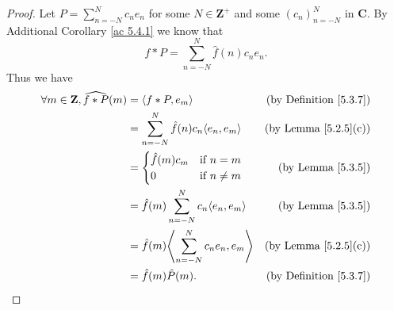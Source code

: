 \begin{proof}
    Let \(P = \sum_{n = -N}^N c_n e_n\) for some \(N \in \mathbf{Z}^+\) and some \((c_n)_{n = -N}^N\) in \(\mathbf{C}\).
    By Additional Corollary \ref{ac 5.4.1} we know that
    \[
        f * P = \sum_{n = -N}^N \hat{f}(n) c_n e_n.
    \]
    Thus we have
    \begin{align*}
        \forall m \in \mathbf{Z}, \widehat{f * P}(m) & = \inner{f * P, e_m}                               & \text{(by Definition \ref{5.3.7})} \\
                                                     & = \sum_{n = -N}^N \hat{f}(n) c_n \inner{e_n, e_m}  & \text{(by Lemma \ref{5.2.5}(c))}   \\
                                                     & = \begin{cases}
                                                             \hat{f}(m) c_m & \text{if } n = m    \\
                                                             0              & \text{if } n \neq m
                                                         \end{cases}            & \text{(by Lemma \ref{5.3.5})}                                \\
                                                     & = \hat{f}(m) \sum_{n = -N}^N c_n \inner*{e_n, e_m} & \text{(by Lemma \ref{5.3.5})}      \\
                                                     & = \hat{f}(m) \inner*{\sum_{n = -N}^N c_n e_n, e_m} & \text{(by Lemma \ref{5.2.5}(c))}   \\
                                                     & = \hat{f}(m) \hat{P}(m).                           & \text{(by Definition \ref{5.3.7})}
    \end{align*}


\end{proof}
